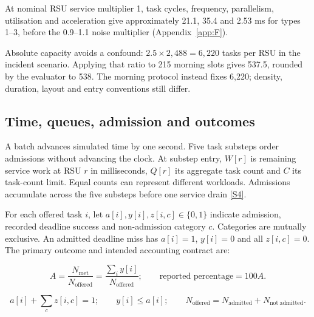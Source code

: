 \documentclass[12pt,a4paper]{article}
\begin{document}
At nominal RSU service multiplier 1, task cycles, frequency, parallelism, utilisation and acceleration give approximately 21.1, 35.4 and 2.53 ms for types 1--3, before the 0.9--1.1 noise multiplier (Appendix~\ref{app:F}).

Absolute capacity avoids a confound: $2.5\times2{,}488=6{,}220$ tasks per RSU in the incident scenario. Applying that ratio to 215 morning slots gives 537.5, rounded by the evaluator to 538. The morning protocol instead fixes 6,220; density, duration, layout and entry conventions still differ.

\FloatBarrier
\subsection{Time, queues, admission and outcomes}\label{sec:2.4}

A batch advances simulated time by one second. Five task substeps order admissions without advancing the clock. At substep entry, $W[r]$ is remaining service work at RSU $r$ in milliseconds, $Q[r]$ its aggregate task count and $C$ its task-count limit. Equal counts can represent different workloads. Admissions accumulate across the five substeps before one service drain \hyperref[source-s4]{[S4]}.

For each offered task $i$, let $a[i],y[i],z[i,c]\in\{0,1\}$ indicate admission, recorded deadline success and non-admission category $c$. Categories are mutually exclusive. An admitted deadline miss has $a[i]=1$, $y[i]=0$ and all $z[i,c]=0$. The primary outcome and intended accounting contract are:

\begin{equation}\label{eq:1}
 A=\frac{N_{\mathrm{met}}}{N_{\mathrm{offered}}}
  =\frac{\sum_i y[i]}{N_{\mathrm{offered}}};
 \qquad \text{reported percentage}=100A.
\end{equation}

\begin{equation}\label{eq:2}
 a[i]+\sum_c z[i,c]=1;\qquad y[i]\leq a[i];\qquad
 N_{\mathrm{offered}}=N_{\mathrm{admitted}}+N_{\mathrm{not\ admitted}}.
\end{equation}
\end{document}
